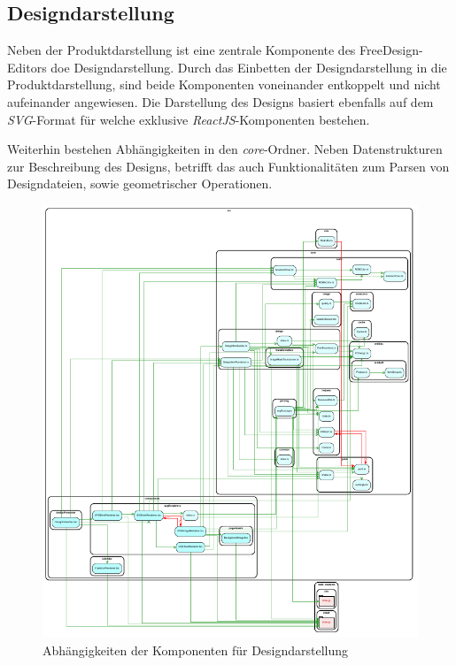 \subsection{Designdarstellung}
Neben der Produktdarstellung ist eine zentrale Komponente des FreeDesign-Editors doe Designdarstellung.
Durch das Einbetten der Designdarstellung in die Produktdarstellung, sind beide Komponenten voneinander entkoppelt und nicht aufeinander angewiesen. Die Darstellung des Designs basiert ebenfalls auf dem \textit{SVG}-Format für welche exklusive \textit{ReactJS}-Komponenten bestehen.

Weiterhin bestehen Abhängigkeiten in den \textit{core}-Ordner. Neben Datenstrukturen zur Beschreibung des Designs, betrifft das auch Funktionalitäten zum Parsen von Designdateien, sowie geometrischer Operationen. 


\begin{figure}[H]
    \centering
    \includegraphics{diagrams/Ist-Architektur/design-presenter-analysis.pdf}
    \caption{Abhängigkeiten der Komponenten für Designdarstellung}
    \label{fig:Designdarstellung}
\end{figure}


